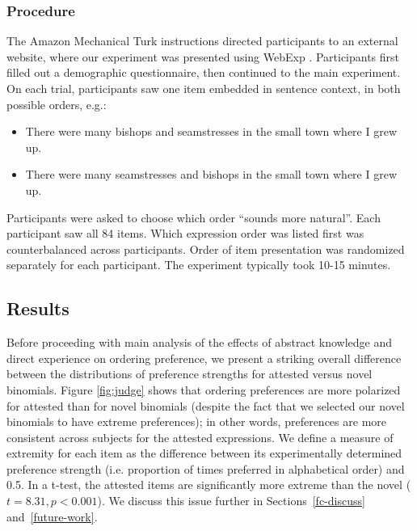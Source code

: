 \documentclass[authoryear]{elsarticle}
\begin{document}
\subsubsection{Procedure}
The Amazon Mechanical Turk instructions directed participants to an external website, where our experiment was presented using WebExp \citep{Keller:2009wn}. Participants first filled out a demographic questionnaire, then continued to the main experiment. On each trial, participants saw one item embedded in sentence context, in both possible orders, e.g.:
\begin{itemize}
\item There were many bishops and seamstresses in the small town where I grew up.
\item There were many seamstresses and bishops in the small town where I grew up.
\end{itemize}
Participants were asked to choose which order ``sounds more natural''. Each participant saw all 84 items. Which expression order was listed first was counterbalanced across participants. Order of item presentation was randomized separately for each participant. The experiment typically took 10-15 minutes.

\subsection{Results}
Before proceeding with main analysis of the effects of abstract knowledge and direct experience on ordering preference, we present a striking overall difference between the distributions of preference strengths for attested versus novel binomials. Figure \ref{fig:judge} shows that ordering preferences are more polarized for attested than for novel binomials (despite the fact that we selected our novel binomials to have extreme preferences); in other words, preferences are more consistent across subjects for the attested expressions. We define a measure of extremity for each item as the difference between its experimentally determined preference strength (i.e. proportion of times preferred in alphabetical order) and 0.5. In a t-test, the attested items are significantly more extreme than the novel ($t=8.31, p < 0.001$). We discuss this issue further in Sections~\ref{fc-discuss} and~\ref{future-work}.
\end{document}

